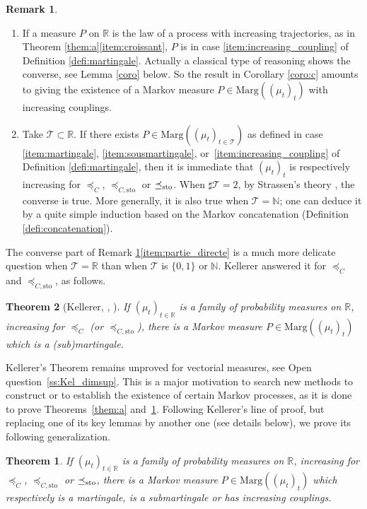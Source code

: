 \documentclass[JEP,XML,SOM,Unicode,NoEqCountersInSection,NoFloatCountersInSection,published]{cedram}
\theoremstyle{plain}
\newtheorem{themBJ}{Theorem}
\newtheorem{them}{Theorem}[section]
\theoremstyle{definition}
\newtheorem{rem}[them]{Remark}
\newcommand{\Tt}{{\mathcal T}}
\newcommand{\ma}{\mathrm{Marg}}
\newcommand{\R}{\mathbb{R}}
\newcommand{\N}{\mathbb{N}}
\newcommand{\sto}{\mathrm{sto}}
\newcommand{\leqc}{\preceq_{C}}
\newcommand{\leqcs}{\preceq_{C,\sto}}
\newcommand{\leqs}{\preceq_{\text{\rm sto}}}
\begin{document}
\skpt
\begin{rem}\label{rem:martingale}
\begin{enumerate}
\item
\label{item:traj_croiss} If a measure $P$ on $\R$ is the law of a process with increasing trajectories, as in Theorem \ref{them:a}\eqref{item:croissant}, $P$ is in case \eqref{item:increasing_coupling} of Definition \ref{defi:martingale}. Actually a classical type of reasoning shows the converse, see Lemma \ref{coro} below. So the result in Corollary \ref{coro:c} amounts to giving the existence of a Markov measure $P\in\ma((\mu_t)_t)$ with increasing couplings.

\item
\label{item:partie_directe} Take $\Tt\subset\R$. If there exists $P\in\ma((\mu_t)_{t\in\Tt})$ as defined in case \eqref{item:martingale}, \eqref{item:sousmartingale}, or~\eqref{item:increasing_coupling} of Definition \ref{defi:martingale}, then it is immediate that $(\mu_t)_t$ is respectively increasing for $\leqc$, $\leqcs$ or $\leqs$. When $\sharp\Tt=2$, by Strassen's theory \cite{St65}, the converse is true. More generally, it is also true when $\Tt=\N$; one can deduce it by a quite simple induction based on the Markov concatenation (Definition \ref{defi:concatenation}).
\end{enumerate}
\end{rem}

The converse part of Remark \ref{rem:martingale}\eqref{item:partie_directe} is a much more delicate question when $\Tt=\R$ than when $\Tt$ is $\{0,1\}$ or $\N$. Kellerer answered it for $\leqc$ and $\leqcs$, as follows.

\begin{them}[Kellerer, {\cite[Th.\,3]{Ke72}, \cite{Ke73}}]\label{them:kellerer_intro} If $(\mu_t)_{t\in \R}$ is a family of probability measures on\/ $\R$, increasing for $\leqc$ (or $\leqcs$), there is a Markov measure $P\in\ma((\mu_t)_t)$ which is a (sub)martingale.
\end{them}

Kellerer's Theorem remains unproved for vectorial measures, see Open question~\ref{ss:Kel_dimsup}. This is a major motivation to search new methods to construct or to establish the existence of certain Markov processes, as it is done to prove Theorems~\ref{them:a} and~\ref{them:c}. Following Kellerer's line of proof, but replacing one of its key lemmas by another one (see details below), we prove its following generalization.
\begin{themBJ}\label{them:c}If $(\mu_t)_{t\in \R}$ is a family of probability measures on\/ $\R$, increasing for $\leqc$, $\leqcs$ or $\leqs$, there is a Markov measure $P\in\ma((\mu_t)_t)$ which respectively is a martingale, is a submartingale or has increasing couplings.
\end{themBJ}
\end{document}
